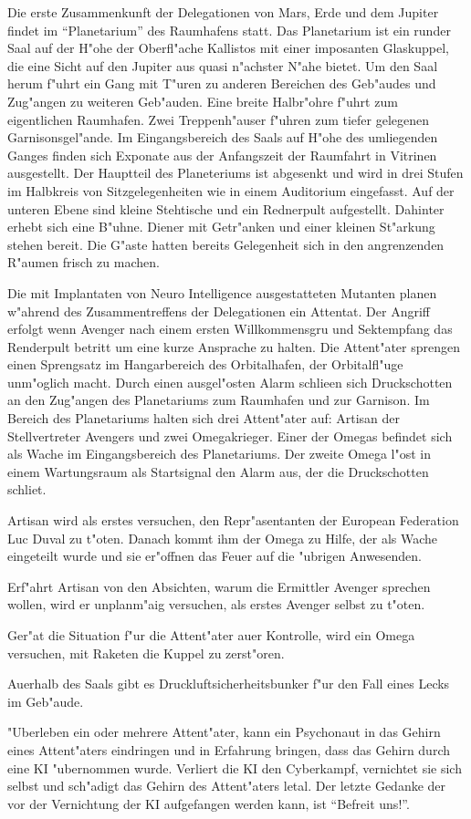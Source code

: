Die erste Zusammenkunft der Delegationen von Mars, Erde und dem Jupiter findet im "`Planetarium"' des Raumhafens statt. Das Planetarium ist ein runder Saal auf der H"ohe der Oberfl"ache Kallistos mit einer imposanten Glaskuppel, die eine Sicht auf den Jupiter aus quasi n"achster N"ahe bietet. Um den Saal herum f"uhrt ein Gang mit T"uren zu anderen Bereichen des Geb"audes und Zug"angen zu weiteren Geb"auden. Eine breite Halbr"ohre f"uhrt zum eigentlichen Raumhafen. Zwei Treppenh"auser f"uhren zum tiefer gelegenen Garnisonsgel"ande. Im Eingangsbereich des Saals auf H"ohe des umliegenden Ganges finden sich Exponate aus der Anfangszeit der Raumfahrt in Vitrinen ausgestellt. Der Hauptteil des Planeteriums ist abgesenkt und wird in drei Stufen im Halbkreis von Sitzgelegenheiten wie in einem Auditorium eingefasst. Auf der unteren Ebene sind kleine Stehtische und ein Rednerpult aufgestellt. Dahinter erhebt sich eine B"uhne. Diener mit Getr"anken und einer kleinen St"arkung stehen bereit. Die G"aste hatten bereits Gelegenheit sich in den angrenzenden R"aumen frisch zu machen.

Die mit Implantaten von Neuro Intelligence ausgestatteten Mutanten planen w"ahrend des Zusammentreffens der Delegationen ein Attentat. Der Angriff erfolgt wenn Avenger nach einem ersten Willkommensgru\3 und Sektempfang das Renderpult betritt um eine kurze Ansprache zu halten. Die Attent"ater sprengen einen Sprengsatz im Hangarbereich des Orbitalhafen, der Orbitalfl"uge unm"oglich macht. Durch einen ausgel"osten Alarm schlie\3en sich Druckschotten an den Zug"angen des Planetariums zum Raumhafen und zur Garnison. Im Bereich des Planetariums halten sich drei Attent"ater auf: Artisan der Stellvertreter Avengers und zwei Omegakrieger. Einer der Omegas befindet sich als Wache im Eingangsbereich des Planetariums. Der zweite Omega l"ost in einem Wartungsraum als Startsignal den Alarm aus, der die Druckschotten schlie\3t.

\begin{remarks}
	Artisan wird als erstes versuchen, den Repr"asentanten der European Federation Luc Duval zu t"oten. Danach kommt ihm der Omega zu Hilfe, der als Wache eingeteilt wurde und sie er"offnen das Feuer auf die "ubrigen Anwesenden.
	
	Erf"ahrt Artisan von den Absichten, warum die Ermittler Avenger sprechen wollen, wird er unplanm"a\3ig versuchen, als erstes Avenger selbst zu t"oten.
	
	Ger"at die Situation f"ur die Attent"ater au\3er Kontrolle, wird ein Omega versuchen, mit Raketen die Kuppel zu zerst"oren.
	
	Au\3erhalb des Saals gibt es Druckluftsicherheitsbunker f"ur den Fall eines Lecks im Geb"aude.
	
	"Uberleben ein oder mehrere Attent"ater, kann ein Psychonaut in das Gehirn eines Attent"aters eindringen und in Erfahrung bringen, dass das Gehirn durch eine KI "ubernommen wurde. Verliert die KI den Cyberkampf, vernichtet sie sich selbst und sch"adigt das Gehirn des Attent"aters letal. Der letzte Gedanke der vor der Vernichtung der KI aufgefangen werden kann, ist "`Befreit uns!"'.
\end{remarks}

